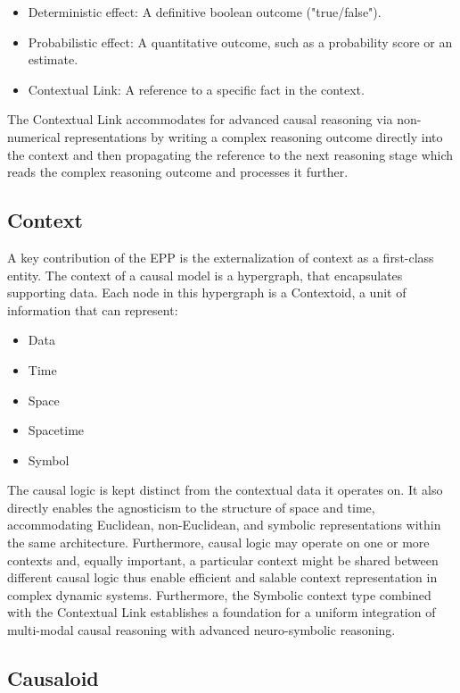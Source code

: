 \begin{itemize}
	\item Deterministic effect: A definitive boolean outcome ("true/false").
	\item Probabilistic effect: A quantitative outcome, such as a probability score or an estimate.
	\item Contextual Link: A reference to a specific fact in the context. 
\end{itemize}

The Contextual Link accommodates for advanced causal reasoning via non-numerical representations by
writing a complex reasoning outcome directly into the context and then propagating the reference to
the next reasoning stage which reads the complex reasoning outcome and processes it further. 

\subsection{Context}
\label{sec:epp_context}

A key contribution of the EPP is the externalization of context as a first-class entity.
The context of a causal model is a hypergraph, that encapsulates supporting data. 
Each node in this hypergraph is a Contextoid, a unit of information that can represent:

\begin{itemize}
	\item Data
	\item Time
	\item Space
	\item Spacetime
	\item Symbol 
\end{itemize}


The causal logic is kept distinct from the contextual data it operates on. It also directly enables the  agnosticism to the structure of space and time, accommodating Euclidean, non-Euclidean, and symbolic representations within the same architecture. Furthermore,  causal logic  may operate on one or more contexts and, equally important, a particular context might be shared between different causal logic thus enable efficient and salable context representation in complex dynamic systems. Furthermore, the Symbolic context type combined with the Contextual Link establishes a foundation for a uniform integration of multi-modal causal reasoning with advanced neuro-symbolic reasoning.

\subsection{Causaloid}
\label{sec:epp_causaloid}

